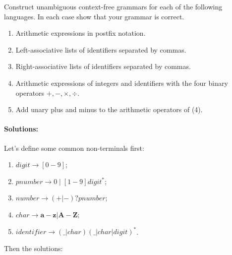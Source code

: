 \documentclass[scheme=plain,12pt]{ctexart}
\begin{document}
    Construct unambiguous context-free grammars for each of the following languages. In each case show that your grammar is correct.

    \begin{enumerate}
        \item Arithmetic expressions in postfix notation.
        \item Left-associative lists of identifiers separated by commas.
        \item Right-associative lists of identifiers separated by commas.
        \item Arithmetic expressions of integers and identifiers with the four binary operators $+, -, \times, \div$.
        \item Add unary plus and minus to the arithmetic operators of (4).
    \end{enumerate}

    \paragraph*{Solutions:}

    Let's define some common non-terminals first:

    \begin{enumerate}
        \item $digit \to [0-9]$;
        \item $pnumber \to 0\;|\;[1-9]digit^*$;
        \item $number \to (+|-)?pnumber$;
        \item $char \to \mathbf{a}-\mathbf{z}|\mathbf{A}-\mathbf{Z}$;
        \item $identifier \to (\_|char)(\_|char|digit)^*$.
    \end{enumerate}

    Then the solutions:
\end{document}
